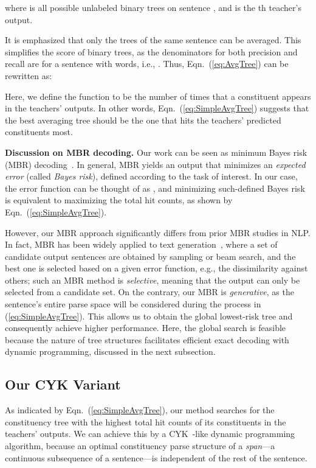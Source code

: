 \documentclass{article}
\begin{document}
where  is all possible unlabeled binary trees on sentence , and  is the th teacher's output. 

It is emphasized that only the trees of the same sentence can be averaged. This simplifies the  score of binary trees, as the denominators for both precision and recall are  for a sentence with  words, i.e., . Thus, Eqn.~(\ref{eq:AvgTree}) can be rewritten as:

Here, we define the  function to be the number of times that a constituent  appears in the teachers’ outputs. In other words, Eqn.~(\ref{eq:SimpleAvgTree}) suggests that the best averaging tree should be the one that hits the teachers' predicted constituents most.

\textbf{Discussion on MBR decoding.}
\label{discussion:SelectiveMBR}
Our work can be seen as minimum Bayes risk (MBR) decoding~\citep{MBRbook}. In general, MBR yields an output that minimizes an \textit{expected error} (called \textit{Bayes risk}), defined according to the task of interest. In our case, the error function can be thought of as , and minimizing such-defined Bayes risk is equivalent to maximizing the total hit counts, as shown by Eqn.~(\ref{eq:SimpleAvgTree}).

However, our MBR approach significantly differs from prior MBR studies in NLP. In fact, MBR has been widely applied to text generation~\citep{kumar-byrne-2004-minimum,10.1162/tacl_a_00491,suzgun-etal-2023-follow}, where a set of candidate output sentences are obtained by sampling or beam search, and the best one is selected based on a given error function, e.g., the dissimilarity against others; such an MBR method is \textit{selective}, meaning that the output can only be selected from a candidate set. On the contrary, our MBR is \textit{generative}, as the sentence's entire parse space  will be considered during the  process in (\ref{eq:SimpleAvgTree}). This allows us to obtain the global lowest-risk tree and consequently achieve higher performance. 
Here, the global search is feasible because the nature of tree structures facilitates efficient exact decoding with dynamic programming, discussed in the next subsection.

\subsection{Our CYK Variant}\label{Sec:OurCYK}

As indicated by Eqn.~(\ref{eq:SimpleAvgTree}), our method searches for the constituency tree with the highest total hit counts of its constituents in the teachers' outputs. We can achieve this by a CYK~\citep{Kasami1965AnER,YOUNGER1967189}-like dynamic programming algorithm, because an optimal constituency parse structure of a \textit{span}---a continuous subsequence of a sentence---is independent of the rest of the sentence.
\end{document}
